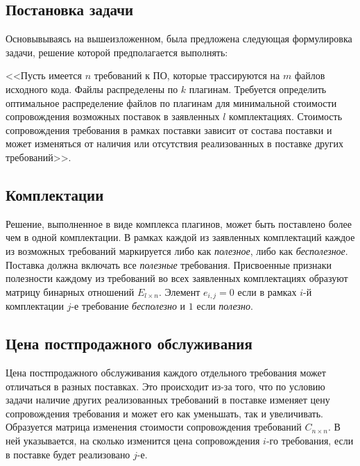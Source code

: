 \subsection*{Постановка задачи}
Основывываясь на вышеизложенном, была предложена следующая формулировка задачи, решение которой предполагается выполнять:

<<Пусть имеется $n$ требований к ПО, которые трассируются на $m$ файлов исходного кода. Файлы распределены по $k$ плагинам. Требуется определить оптимальное распределение файлов по плагинам для минимальной стоимости сопровождения возможных поставок в заявленных $l$ комплектациях. Стоимость сопровождения требования в рамках поставки зависит от состава поставки и может изменяться от наличия или отсутствия реализованных в поставке других требований>>.

\subsection*{Комплектации}
Решение, выполненное в виде комплекса плагинов, может быть поставлено более чем в одной комплектации. В рамках каждой из заявленных комплектаций каждое из возможных требований маркируется либо как \textit{полезное}, либо как \textit{бесполезное}. Поставка должна включать все \textit{полезные} требования. Присвоенные признаки полезности каждому из требований во всех заявленных комплектациях образуют матрицу бинарных отношений $E_{l \times n}$. Элемент $e_{i, j} = 0$ если в рамках $i$-й комплектации $j$-е требование \textit{бесполезно} и $1$ если \textit{полезно}.

\subsection*{Цена постпродажного обслуживания}
Цена постпродажного обслуживания каждого отдельного требования может отличаться в разных поставках. Это происходит из-за того, что по условию задачи наличие других реализованных требований в поставке изменяет цену сопровождения требования и может его как уменьшать, так и увеличивать. Образуется матрица изменения стоимости сопровождения требований $C_{n \times n}$. В ней указывается, на сколько изменится цена сопровождения $i$-го требования, если в поставке будет реализовано $j$-е.

